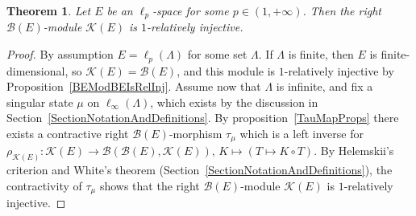 \documentclass[12pt]{article}
\newtheorem{theorem}{Theorem}[section]
\begin{document}
\begin{theorem}\label{BHModKHIsRelInj}
    Let $E$ be an $\ell_p$-space for some $p\in(1,+\infty)$. Then the 
    right $\mathcal{B}(E)$-module $\mathcal{K}(E)$ is $1$-relatively injective.
\end{theorem}
\begin{proof} By assumption $E=\ell_p(\Lambda)$ for some set $\Lambda$. If 
    $\Lambda$ is finite, then $E$ is finite-dimensional, 
    so $\mathcal{K}(E)=\mathcal{B}(E)$, and this module is $1$-relatively 
    injective by Proposition~\ref{BEModBEIsRelInj}. 
    Assume now that $\Lambda$ is infinite, and fix a singular state $\mu$ 
    on $\ell_\infty(\Lambda)$, which exists by the discussion in 
    Section~\ref{SectionNotationAndDefinitions}. By 
    proposition~\ref{TauMapProps} there exists a contractive right 
    $\mathcal{B}(E)$-morphism $\tau_{\mu}$ which is a left
    inverse for 
    $
        \rho_{\mathcal{K}(E)}:
        \mathcal{K}(E)\to\mathcal{B}(\mathcal{B}(E), \mathcal{K}(E)), \,
        K\mapsto(T\mapsto K\circ T).
    $
    By Helemskii's criterion and White's theorem 
    (Section~\ref{SectionNotationAndDefinitions}), the contractivity 
    of $\tau_{\mu}$ shows that the right $\mathcal{B}(E)$-module 
    $\mathcal{K}(E)$ is $1$-relatively injective.
\end{proof}


\end{document}
